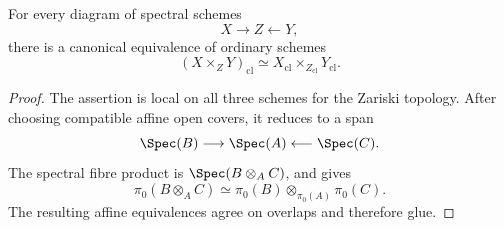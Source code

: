 \begin{proposition}
\label{prop:global-classical-truncation-fibre-products}
For every diagram of spectral schemes
\[
    X
    \longrightarrow
    Z
    \longleftarrow
    Y,
\]
there is a canonical equivalence of ordinary schemes
\[
    (X\times_ZY)_{\mathrm{cl}}
    \simeq
    X_{\mathrm{cl}}
    \times_{Z_{\mathrm{cl}}}
    Y_{\mathrm{cl}}.
\]
\end{proposition}

\begin{proof}
The assertion is local on all three schemes for the Zariski topology.
After choosing compatible affine open covers, it reduces to a span
\[
    \Spec(B)
    \longrightarrow
    \Spec(A)
    \longleftarrow
    \Spec(C).
\]
The spectral fibre product is $\Spec(B\otimes_A C)$, and
 gives
\[
    \pi_0(B\otimes_A C)
    \simeq
    \pi_0(B)
    \otimes_{\pi_0(A)}
    \pi_0(C).
\]
The resulting affine equivalences agree on overlaps and therefore glue.
\end{proof}

